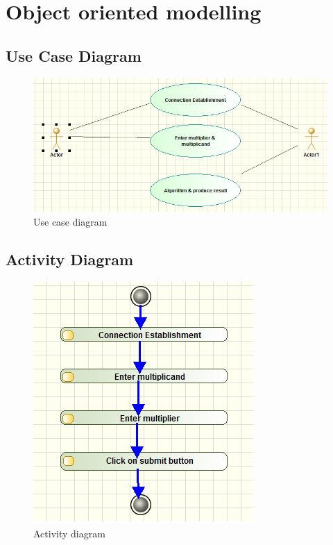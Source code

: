 \documentclass[a4paper,12pt]{article}
\begin{document}
\section{Object oriented modelling}
\subsection{Use Case Diagram}

\begin{figure}[h!]
			\centering
			\includegraphics[scale=0.8]{usecase}
			\caption{Use case diagram}
			\label{Use case diagram}
		\end{figure}

\newpage

\subsection{Activity Diagram}

\begin{figure}[h!]
			\centering
			\includegraphics[scale=0.95]{activity}
			\caption{Activity diagram}
			\label{Activity diagram}
		\end{figure}
\end{document}
